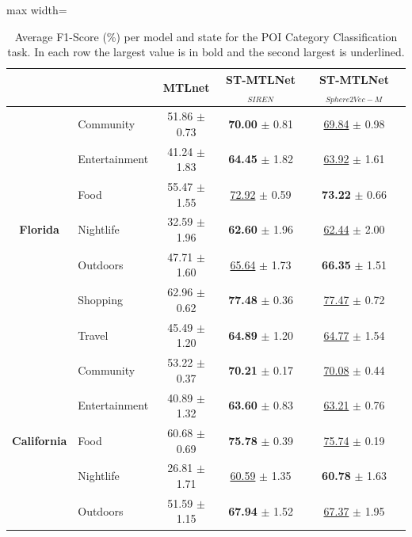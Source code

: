 \begin{table}[htbp]
\centering
\caption{Average F1-Score (\%) per model and state for the POI Category Classification task. In each row the largest value is in bold and the second largest is underlined.}
\label{tab:courb:category}
\begin{adjustbox}{max width=\textwidth}
\begin{tabular}{clccc}
\toprule
 & & \textbf{MTLnet} & \textbf{ST-MTLNet$_{SIREN}$} & \textbf{ST-MTLNet$_{Sphere2Vec-M}$} \\
\midrule
\multirow{7}{*}{\textbf{Florida}} & Community & 51.86 $\pm$ 0.73 & \textbf{70.00} $\pm$ 0.81 & \underline{69.84} $\pm$ 0.98 \\
 & Entertainment & 41.24 $\pm$ 1.83 & \textbf{64.45} $\pm$ 1.82 & \underline{63.92} $\pm$ 1.61 \\
 & Food & 55.47 $\pm$ 1.55 & \underline{72.92} $\pm$ 0.59 & \textbf{73.22} $\pm$ 0.66 \\
 & Nightlife & 32.59 $\pm$ 1.96 & \textbf{62.60} $\pm$ 1.96 & \underline{62.44} $\pm$ 2.00 \\
 & Outdoors & 47.71 $\pm$ 1.60 & \underline{65.64} $\pm$ 1.73 & \textbf{66.35} $\pm$ 1.51 \\
 & Shopping & 62.96 $\pm$ 0.62 & \textbf{77.48} $\pm$ 0.36 & \underline{77.47} $\pm$ 0.72 \\
 & Travel & 45.49 $\pm$ 1.20 & \textbf{64.89} $\pm$ 1.20 & \underline{64.77} $\pm$ 1.54 \\
\midrule
\multirow{7}{*}{\textbf{California}} & Community & 53.22 $\pm$ 0.37 & \textbf{70.21} $\pm$ 0.17 & \underline{70.08} $\pm$ 0.44 \\
 & Entertainment & 40.89 $\pm$ 1.32 & \textbf{63.60} $\pm$ 0.83 & \underline{63.21} $\pm$ 0.76 \\
 & Food & 60.68 $\pm$ 0.69 & \textbf{75.78} $\pm$ 0.39 & \underline{75.74} $\pm$ 0.19 \\
 & Nightlife & 26.81 $\pm$ 1.71 & \underline{60.59} $\pm$ 1.35 & \textbf{60.78} $\pm$ 1.63 \\
 & Outdoors & 51.59 $\pm$ 1.15 & \textbf{67.94} $\pm$ 1.52 & \underline{67.37} $\pm$ 1.95 \\

\end{tabular}
\end{adjustbox}
\end{table}
